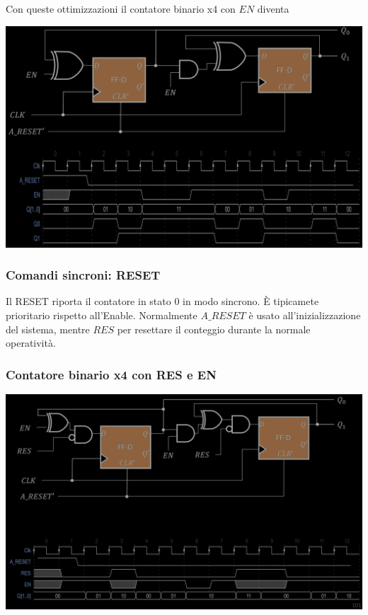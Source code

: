 \documentclass{article}
\begin{document}
Con queste ottimizzazioni il contatore binario x4 con $EN$ diventa
\begin{center}
    \includegraphics[scale=0.35]{contatore binario x4 en v2.png}
\end{center}
\subsubsection{Comandi sincroni: RESET}
Il RESET riporta il contatore in stato 0 in modo sincrono. È tipicamete prioritario rispetto all'Enable. Normalmente $A\_RESET$ è usato all'inizializzazione del sistema, mentre $RES$ per resettare il conteggio durante la normale operatività.
\subsubsection*{Contatore binario x4 con RES e EN}
\begin{center}
    \includegraphics[scale=0.4]{contatore binario x4 res es.png}
\end{center}
\end{document}

